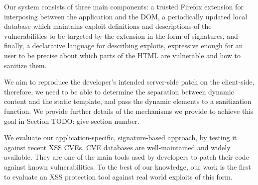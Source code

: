  Our system consists of three main components: a trusted Firefox extension for interposing between the application and the DOM, a periodically updated local database which maintains exploit definitions and descriptions of the vulnerabilities to be targeted by the extension in the form of signatures, and finally, a declarative language for describing exploits, expressive enough for an user to be precise about which parts of the HTML are vulnerable and how to sanitize them.
 
 We aim to reproduce the developer's intended server-side patch on the client-side, therefore, we need to be able to determine the separation between dynamic content and the static template, and pass the dynamic elements to a sanitization function. We provide further details of the mechanisms we provide to achieve this goal in Section TODO: give section number.
 
 We evaluate our application-specific, signature-based approach, by testing it against recent XSS CVEs. CVE databases are well-maintained and widely available. They are one of the main tools used by developers to patch their code against known vulnerabilities. To the best of our knowledge, our work is the first to evaluate an XSS protection tool against real world exploits of this form.


